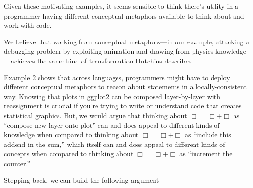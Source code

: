 Given these motivating examples, it seems sensible to think there's
utility in a programmer having different conceptual metaphors available
to think about and work with code.

We believe that working from conceptual metaphors---in our example, attacking a debugging problem by exploiting animation and drawing from physics knowledge---achieves the same kind of transformation Hutchins describes.

Example
2 shows that across languages, programmers might have to deploy
different conceptual metaphors to reason about statements in a
locally-consistent way. Knowing that plots in ggplot2 can be composed
layer-by-layer with reassignment is crucial if you're trying to write or
understand code that creates statistical graphics. But, we would argue
that thinking about $\Box = \Box + \Box$ as ``compose new layer onto plot'' can and
does appeal to different kinds of knowledge when compared to thinking
about $\Box = \Box + \Box$ as ``include this addend in the sum,'' which itself can
and does appeal to different kinds of concepts when compared to thinking
about $\Box = \Box + \Box$ as ``increment the counter.''

Stepping back, we can build the following argument

